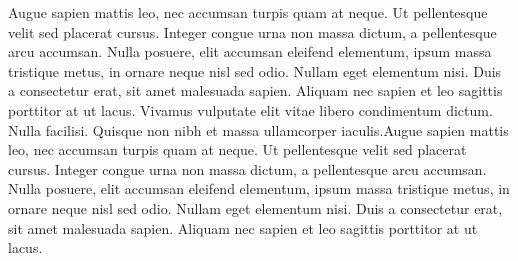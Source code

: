 Augue sapien mattis leo, nec accumsan turpis quam at neque. Ut pellentesque velit sed placerat cursus. Integer congue urna non massa dictum, a pellentesque arcu accumsan. Nulla posuere, elit accumsan eleifend elementum, ipsum massa tristique metus, in ornare neque nisl sed odio. Nullam eget elementum nisi. Duis a consectetur erat, sit amet malesuada sapien. Aliquam nec sapien et leo sagittis porttitor at ut lacus. Vivamus vulputate elit vitae libero condimentum dictum. Nulla facilisi. Quisque non nibh et massa ullamcorper iaculis.Augue sapien mattis leo, nec accumsan turpis quam at neque. Ut pellentesque velit sed placerat cursus. Integer congue urna non massa dictum, a pellentesque arcu accumsan. Nulla posuere, elit accumsan eleifend elementum, ipsum massa tristique metus, in ornare neque nisl sed odio. Nullam eget elementum nisi. Duis a consectetur erat, sit amet malesuada sapien. Aliquam nec sapien et leo sagittis porttitor at ut lacus. 

